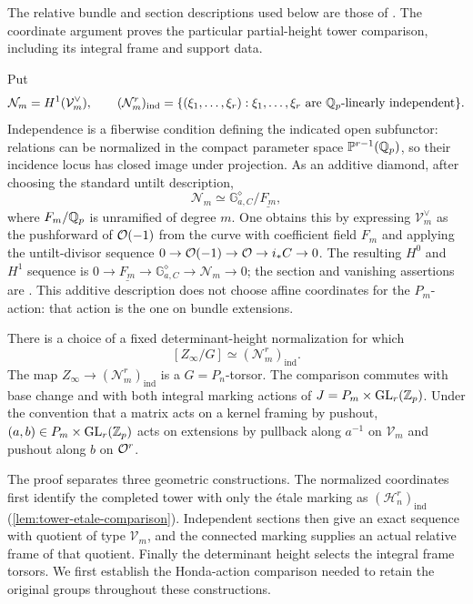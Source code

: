 The relative bundle and section descriptions used below are those of
\citet[Sections~II.2--II.3]{farguesScholze2021}. The coordinate
argument proves the particular partial-height tower comparison,
including its integral frame and support data.

Put
\[
 \mathcal N_m=H^1(\mathcal V_m^{\vee}),\qquad
 (\mathcal N_m^r)_{\mathrm{ind}}
 =\{(\xi_1,\ldots,\xi_r):\xi_1,\ldots,\xi_r
       \text{ are $\mathbb Q_p$-linearly independent}\}.
\]
Independence is a fiberwise condition defining the indicated open
subfunctor: relations can be normalized in the compact parameter
space $\mathbb P^{r-1}(\mathbb Q_p)$, so their incidence locus has closed
image under projection. As an additive diamond, after choosing the standard untilt
description,
\begin{equation}\label{eq:tower-additive-model}
 \mathcal N_m\simeq
 \mathbb G_{a,C}^{\diamond}/\underline{F_m},
\end{equation}
where $F_m/\mathbb Q_p$ is unramified of degree $m$. One obtains this by
expressing $\mathcal V_m^{\vee}$ as the pushforward of $\mathcal O(-1)$
from the curve with coefficient field $F_m$ and applying the untilt-divisor
sequence
$0\to\mathcal O(-1)\to\mathcal O\to i_*C\to0$.
The resulting $H^0$ and $H^1$ sequence is
$0\to\underline{F_m}\to\mathbb G_{a,C}^{\diamond}
\to\mathcal N_m\to0$; the section and vanishing assertions are
\cite[Propositions II.2.3, II.2.5(ii), and II.3.4]{farguesScholze2021}.
This additive description does not choose affine coordinates for the
$P_m$-action: that action is the one on bundle extensions.

\begin{theorem}\label{thm:tower-comparison}
There is a choice of a fixed determinant-height normalization for which
\begin{equation}\label{eq:tower-quotient}
 [Z_\infty/G]\simeq(\mathcal N_m^r)_{\mathrm{ind}}.
\end{equation}
The map $Z_\infty\to(\mathcal N_m^r)_{\mathrm{ind}}$ is a
$G=P_n$-torsor. The comparison commutes with base change and with both
integral marking actions of
$J=P_m\times\operatorname{GL}_r(\mathbb Z_p)$. Under the convention that a matrix acts
on a kernel framing by pushout, $(a,b)\in P_m\times\operatorname{GL}_r(\mathbb Z_p)$
acts on extensions by pullback along $a^{-1}$ on $\mathcal V_m$ and
pushout along $b$ on $\mathcal O^r$.
\end{theorem}

The proof separates three geometric constructions.  The normalized
coordinates first identify the completed tower with only the \'{e}tale
marking as $(\mathcal H_n^r)_{\mathrm{ind}}$
(\cref{lem:tower-etale-comparison}).  Independent sections then give
an exact sequence with quotient of type $\mathcal V_m$, and the
connected marking supplies an actual relative frame of that quotient.
Finally the determinant height selects the integral frame torsors.
We first establish the Honda-action comparison needed to retain the
original groups throughout these constructions.

